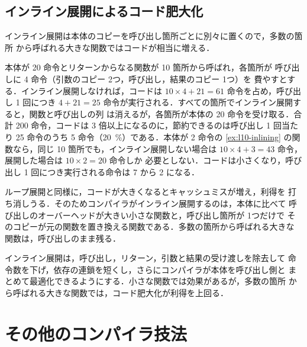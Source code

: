 \documentclass[../main.tex]{subfiles}
\begin{document}
\subsection{インライン展開によるコード肥大化}
\label{sec:l10-inlining-bloat}

インライン展開は本体のコピーを呼び出し箇所ごとに別々に置くので，多数の箇所
から呼ばれる大きな関数ではコードが相当に増える．

\begin{example}
  \label{ex:l10-inlining-size}
  本体が 20 命令とリターンからなる関数が 10 箇所から呼ばれ，各箇所が
  呼び出しに 4 命令（引数のコピー 2つ，呼び出し，結果のコピー 1つ）を
  費やすとする．インライン展開しなければ，コードは
  $10 \times 4 + 21 = 61$ 命令を占め，呼び出し 1 回につき $4 + 21 = 25$
  命令が実行される．すべての箇所でインライン展開すると，関数と呼び出しの列
  は消えるが，各箇所が本体の 20 命令を受け取る．合計 200 命令，コードは
  3 倍以上になるのに，節約できるのは呼び出し 1 回当たり 25 命令のうち
  5 命令（\SI{20}{\percent}）である．本体が 2 命令の \cref{ex:l10-inlining}
  の関数なら，同じ 10 箇所でも，インライン展開しない場合は
  $10 \times 4 + 3 = 43$ 命令，展開した場合は $10 \times 2 = 20$ 命令しか
  必要としない．コードは小さくなり，呼び出し 1 回につき実行される命令は
  7 から 2 になる．
\end{example}

ループ展開と同様に，コードが大きくなるとキャッシュミスが増え，利得を
打ち消しうる．そのためコンパイラがインライン展開するのは，本体に比べて
呼び出しのオーバーヘッドが大きい小さな関数と，呼び出し箇所が 1つだけで
そのコピーが元の関数を置き換える関数である．多数の箇所から呼ばれる大きな
関数は，呼び出しのまま残る．

\begin{keypoint}
  インライン展開は，呼び出し，リターン，引数と結果の受け渡しを除去して
  命令数を下げ，依存の連鎖を短くし，さらにコンパイラが本体を呼び出し側と
  まとめて最適化できるようにする．小さな関数では効果があるが，多数の箇所
  から呼ばれる大きな関数では，コード肥大化が利得を上回る．
\end{keypoint}

\section{その他のコンパイラ技法}
\label{sec:l10-other}
\end{document}
